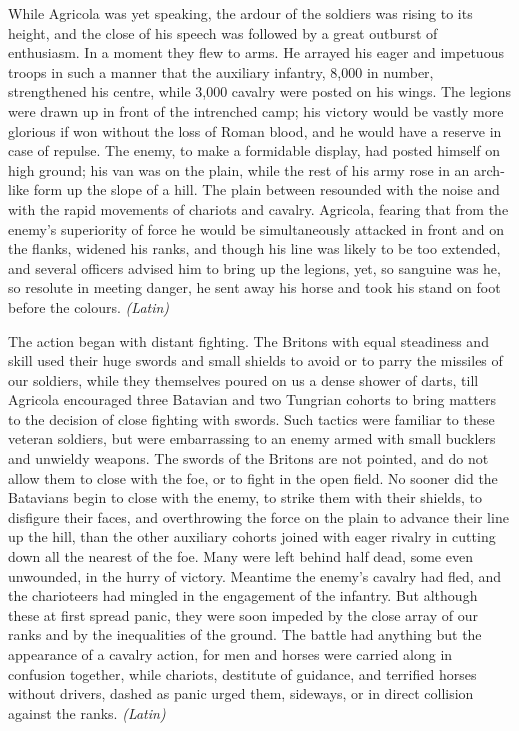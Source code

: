 
While Agricola was yet speaking, the ardour of the soldiers was rising to its height, and the close of his speech was followed by a great outburst of enthusiasm. In a moment they flew to arms. He arrayed his eager and impetuous troops in such a manner that the auxiliary infantry, 8,000 in number, strengthened his centre, while 3,000 cavalry were posted on his wings. The legions were drawn up in front of the intrenched camp; his victory would be vastly more glorious if won without the loss of Roman blood, and he would have a reserve in case of repulse. The enemy, to make a formidable display, had posted himself on high ground; his van was on the plain, while the rest of his army rose in an arch-like form up the slope of a hill. The plain between resounded with the noise and with the rapid movements of chariots and cavalry. Agricola, fearing that from the enemy's superiority of force he would be simultaneously attacked in front and on the flanks, widened his ranks, and though his line was likely to be too extended, and several officers advised him to bring up the legions, yet, so sanguine was he, so resolute in meeting danger, he sent away his horse and took his stand on foot before the colours. \emph{(Latin)}


The action began with distant fighting. The Britons with equal steadiness and skill used their huge swords and small shields to avoid or to parry the missiles of our soldiers, while they themselves poured on us a dense shower of darts, till Agricola encouraged three Batavian and two Tungrian cohorts to bring matters to the decision of close fighting with swords. Such tactics were familiar to these veteran soldiers, but were embarrassing to an enemy armed with small bucklers and unwieldy weapons. The swords of the Britons are not pointed, and do not allow them to close with the foe, or to fight in the open field. No sooner did the Batavians begin to close with the enemy, to strike them with their shields, to disfigure their faces, and overthrowing the force on the plain to advance their line up the hill, than the other auxiliary cohorts joined with eager rivalry in cutting down all the nearest of the foe. Many were left behind half dead, some even unwounded, in the hurry of victory. Meantime the enemy's cavalry had fled, and the charioteers had mingled in the engagement of the infantry. But although these at first spread panic, they were soon impeded by the close array of our ranks and by the inequalities of the ground. The battle had anything but the appearance of a cavalry action, for men and horses were carried along in confusion together, while chariots, destitute of guidance, and terrified horses without drivers, dashed as panic urged them, sideways, or in direct collision against the ranks. \emph{(Latin)}

